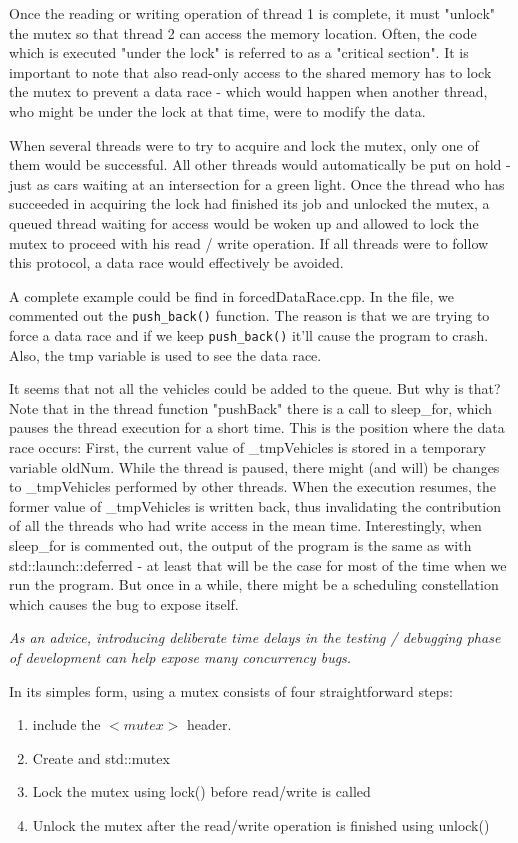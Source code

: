 \documentclass[11pt, a4paper]{article}
\begin{document}
Once the reading or writing operation of thread 1 is complete, it must "unlock" the mutex so that thread 2 can access the memory location. Often, the code which is executed "under the lock" is referred to as a "critical section". It is important to note that also read-only access to the shared memory has to lock the mutex to prevent a data race - which would happen when another thread, who might be under the lock at that time, were to modify the data.

When several threads were to try to acquire and lock the mutex, only one of them would be successful. All other threads would automatically be put on hold - just as cars waiting at an intersection for a green light. Once the thread who has succeeded in acquiring the lock had finished its job and unlocked the mutex, a queued thread waiting for access would be woken up and allowed to lock the mutex to proceed with his read / write operation. If all threads were to follow this protocol, a data race would effectively be avoided.

A complete example could be find in forcedDataRace.cpp. In the file, we commented out the \texttt{push\_back()} function. The reason is that we are trying to force a data race and if we keep \texttt{push\_back()} it'll cause the program to crash. Also, the tmp variable is used to see the data race. 


It seems that not all the vehicles could be added to the queue. But why is that? Note that in the thread function "pushBack" there is a call to sleep\_for, which pauses the thread execution for a short time. This is the position where the data race occurs: First, the current value of \_tmpVehicles is stored in a temporary variable oldNum. While the thread is paused, there might (and will) be changes to \_tmpVehicles performed by other threads. When the execution resumes, the former value of \_tmpVehicles is written back, thus invalidating the contribution of all the threads who had write access in the mean time. Interestingly, when sleep\_for is commented out, the output of the program is the same as with std::launch::deferred - at least that will be the case for most of the time when we run the program. But once in a while, there might be a scheduling constellation which causes the bug to expose itself. 

\textit{As an advice, introducing deliberate time delays in the testing / debugging phase of development can help expose many concurrency bugs.}


In its simples form, using a mutex consists of four straightforward steps:
\begin{enumerate}
\item include the $< mutex >$ header.
	\item Create and std::mutex
	\item Lock the mutex using lock() before read/write is called
	\item Unlock the mutex after the read/write operation is finished using unlock()
\end{enumerate}
\end{document}
